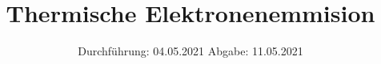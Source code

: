 

\subject{504}
\title{Thermische Elektronenemmision}
\date{%
  Durchführung: 04.05.2021
  \hspace{3em}
  Abgabe: 11.05.2021
}



\maketitle
\thispagestyle{empty}
\tableofcontents
\newpage







\printbibliography{}



